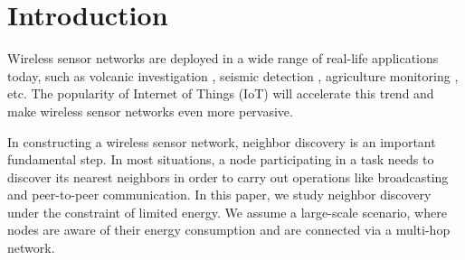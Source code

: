 \section{Introduction}








Wireless sensor networks\cite{akyildiz2002wireless} are deployed in
a wide range of real-life applications today, such as volcanic investigation
\cite{werner2006deploying}, seismic detection \cite{suzuki2007high},
agriculture monitoring \cite{wang2010l3sn}, etc.
The popularity of Internet of Things (IoT) will accelerate this trend
and make wireless sensor networks even more pervasive.

In constructing a wireless sensor network,
neighbor discovery is an important fundamental step.
In most situations, a node participating in a task needs to discover its nearest
neighbors in order to carry out operations like broadcasting and peer-to-peer
communication. In this paper, we study neighbor discovery under the
constraint of limited energy. We assume a
large-scale scenario, where nodes are aware of their energy consumption and
are connected via a multi-hop network.

